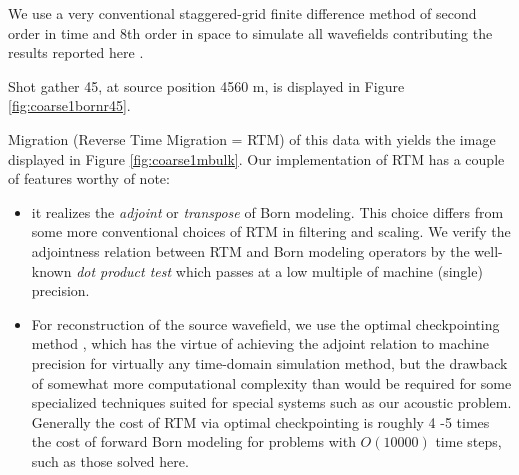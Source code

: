 We use a very conventional staggered-grid finite difference method of
second order in time and 8th order in space to simulate all wavefields
contributing the results reported here \cite[]{Vir:84,Vir:86}.

Shot gather 45, at source position 4560 m, is displayed in Figure
\ref{fig:coarse1bornr45}. 


Migration (Reverse Time Migration = RTM) of this data with yields the
image displayed in Figure \ref{fig:coarse1mbulk}. Our implementation
of RTM has a couple of features worthy of note:
\begin{itemize}
\item it realizes the {\em adjoint} or {\em transpose} of Born
  modeling. This choice differs from some more conventional choices of
  RTM in filtering and scaling. We verify the adjointness relation
  between RTM and Born modeling operators by the well-known {\em dot
    product test} \cite[]{claer:PVI} which passes at a low multiple of
  machine (single) precision.
\item For reconstruction of the source wavefield, we use the optimal
  checkpointing method
  \cite[]{Griewank:92,Griewank:00,Griewank:book,Symes:06a-pub}, which
  has the virtue of achieving the adjoint relation to machine
  precision for virtually any time-domain simulation method, but the
  drawback of somewhat more computational complexity than would be
  required for some specialized techniques suited for special systems
  such as our acoustic problem. Generally the cost of RTM via optimal
  checkpointing is roughly 4 -5 times the cost of forward Born
  modeling for problems with $O(10000)$ time steps, such as those
  solved here.
\end{itemize}

